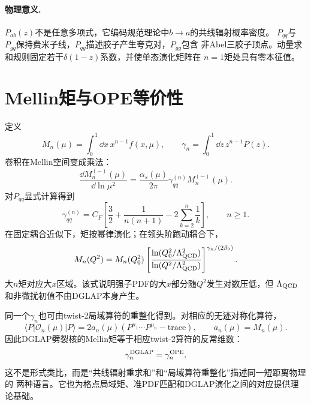 \paragraph{物理意义.}
$P_{ab}(z)$不是任意多项式，它编码规范理论中$b\to a$的共线辐射概率密度。
$P_{qq}$与$P_{gq}$保持费米子线，$P_{qg}$描述胶子产生夸克对，$P_{gg}$包含
非Abel三胶子顶点。动量求和规则固定若干$\delta(1-z)$系数，并使单态演化矩阵在
$n=1$矩处具有零本征值。

\section{Mellin矩与OPE等价性}

定义
\begin{equation}
  M_n(\mu)=\int_0^1\dd x\,x^{n-1}f(x,\mu),
  \qquad
  \gamma_n=\int_0^1\dd z\,z^{n-1}P(z).
  \label{eq:b04-mellin}
\end{equation}
卷积在Mellin空间变成乘法：
\begin{equation}
  \frac{\dd M_n^{(-)}(\mu)}{\dd\ln\mu^2}
  =\frac{\alpha_s(\mu)}{2\pi}\gamma_{qq}^{(n)}M_n^{(-)}(\mu).
  \label{eq:b04-moment-dglap}
\end{equation}
对$P_{qq}$显式计算得到
\begin{equation}
  \gamma_{qq}^{(n)}
  =C_F\left[
  \frac32+\frac{1}{n(n+1)}
  -2\sum_{k=2}^{n}\frac1k\right],
  \qquad n\geq1.
  \label{eq:b04-gamma-qq}
\end{equation}
在固定耦合近似下，矩按幂律演化；在领头阶跑动耦合下，
\begin{equation}
  M_n(Q^2)=M_n(Q_0^2)
  \left[
  \frac{\ln(Q_0^2/\Lambda_{\rm QCD}^2)}
       {\ln(Q^2/\Lambda_{\rm QCD}^2)}
  \right]^{\gamma_n/(2\beta_0)} .
  \label{eq:b04-moment-solution}
\end{equation}
大$n$矩对应大$x$区域。该式说明强子PDF的大$x$部分随$Q^2$发生对数压低，但
$\Lambda_{\rm QCD}$和非微扰初值不由DGLAP本身产生。

同一个$\gamma_n$也可由twist-2局域算符的重整化得到。对相应的无迹对称化算符，
\begin{equation}
  \langle P|\mathcal O_n(\mu)|P\rangle
  =2a_n(\mu)\left(P^{\mu_1}\cdots P^{\mu_n}-\text{trace}\right),
  \qquad
  a_n(\mu)=M_n(\mu).
  \label{eq:b04-ope-moment}
\end{equation}
因此DGLAP劈裂核的Mellin矩等于相应twist-2算符的反常维数：
\begin{equation}
  \gamma_{n}^{\rm DGLAP}=\gamma_n^{\rm OPE}.
  \label{eq:b04-ope-dglap}
\end{equation}
这不是形式类比，而是“共线辐射重求和”和“局域算符重整化”描述同一短距离物理的
两种语言。它也为格点局域矩、准PDF匹配和DGLAP演化之间的对应提供理论基础。

